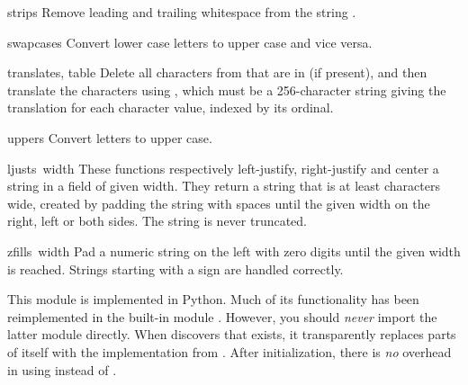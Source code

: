 \begin{funcdesc}{strip}{s}
Remove leading and trailing whitespace from the string .
\end{funcdesc}

\begin{funcdesc}{swapcase}{s}
Convert lower case letters to upper case and vice versa.
\end{funcdesc}

\begin{funcdesc}{translate}{s, table}
Delete all characters from  that are in  (if present), and 
then translate the characters using , which must be
a 256-character string giving the translation for each character
value, indexed by its ordinal.  
\end{funcdesc}

\begin{funcdesc}{upper}{s}
Convert letters to upper case.
\end{funcdesc}

\begin{funcdesc}{ljust}{s\, width}
These functions respectively left-justify, right-justify and center a
string in a field of given width.
They return a string that is at least
characters wide, created by padding the string
with spaces until the given width on the right, left or both sides.
The string is never truncated.
\end{funcdesc}

\begin{funcdesc}{zfill}{s\, width}
Pad a numeric string on the left with zero digits until the given
width is reached.  Strings starting with a sign are handled correctly.
\end{funcdesc}

This module is implemented in Python.  Much of its functionality has
been reimplemented in the built-in module .  However, you
should \emph{never} import the latter module directly.  When
 discovers that  exists, it transparently
replaces parts of itself with the implementation from .
After initialization, there is \emph{no} overhead in using
 instead of .
